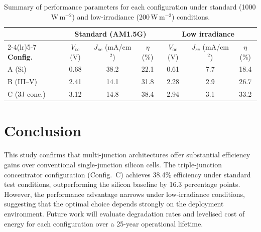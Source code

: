 \documentclass[10pt,twocolumn]{article}
\begin{document}
\begin{table}[!t]
  \centering
  \caption{Summary of performance parameters for each configuration under standard
    (1000\,W\,m$^{-2}$) and low-irradiance (200\,W\,m$^{-2}$) conditions.}
  \label{tab:results}
  \small
  \begin{tabular}{@{}lcccccc@{}}
    \toprule
    & \multicolumn{3}{c}{\textbf{Standard (AM1.5G)}} & \multicolumn{3}{c}{\textbf{Low irradiance}} \\
    \cmidrule(lr){2-4}\cmidrule(lr){5-7}
    \textbf{Config.} & $V_{\text{oc}}$ (V) & $J_{sc}$ (mA/cm$^2$) & $\eta$ (\%) &
                       $V_{\text{oc}}$ (V) & $J_{sc}$ (mA/cm$^2$) & $\eta$ (\%) \\
    \midrule
    A (Si)           & 0.68 & 38.2 & 22.1 & 0.61 & 7.7  & 18.4 \\
    B (III--V)       & 2.41 & 14.1 & 31.8 & 2.28 & 2.9  & 26.7 \\
    C (3J conc.)     & 3.12 & 14.8 & 38.4 & 2.94 & 3.1  & 33.2 \\
    \bottomrule
  \end{tabular}
\end{table}

\section{Conclusion}

This study confirms that multi-junction architectures offer substantial efficiency
gains over conventional single-junction silicon cells. The triple-junction concentrator
configuration (Config.~C) achieves 38.4\% efficiency under standard test conditions,
outperforming the silicon baseline by 16.3 percentage points. However, the performance
advantage narrows under low-irradiance conditions, suggesting that the optimal choice
depends strongly on the deployment environment. Future work will evaluate degradation
rates and levelised cost of energy for each configuration over a 25-year operational
lifetime.
\end{document}
